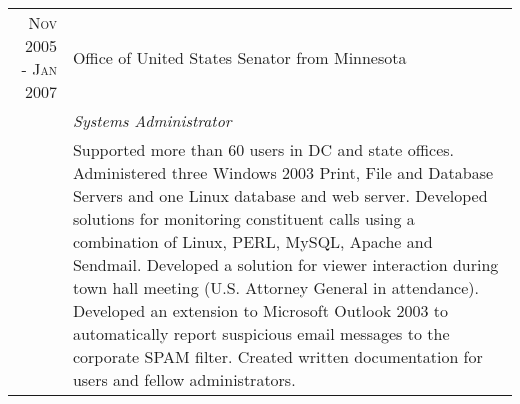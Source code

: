 \documentclass[a4paper,10pt]{article} %
\begin{document}
\begin{tabular}{r|p{11cm}}

\textsc{Nov 2005 - Jan 2007} & Office of United States Senator from Minnesota\\
& \emph{Systems Administrator} \\
& \footnotesize{Supported more than 60 users in DC and state offices. Administered three Windows 2003 Print, File and Database Servers and one Linux database and web server. Developed solutions for monitoring constituent calls using a combination of Linux, PERL, MySQL, Apache and Sendmail. Developed a solution for viewer interaction during town hall meeting (U.S. Attorney General in attendance). Developed an extension to Microsoft Outlook 2003 to automatically report suspicious email messages to the corporate SPAM filter. Created written documentation for users and fellow administrators.}
\end{tabular}



\end{document}
